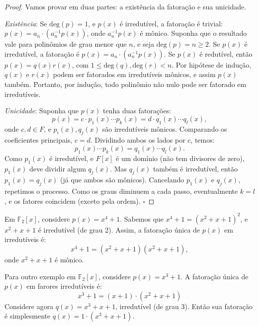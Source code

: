 \begin{proof}
Vamos provar em duas partes: a existência da fatoração e sua unicidade.

  \emph{Existência}: Se $\text{deg}(p) = 1$, e $p(x)$ é irredutível, a
  fatoração é trivial: $p(x) = a_n \cdot (a_n^{-1} p(x))$, onde $a_n^{-1} p(x)$
  é mônico. Suponha que o resultado vale para polinômios de grau menor que $n$,
  e seja $\text{deg}(p) = n \geq 2$. Se $p(x)$ é irredutível, a fatoração é
  $p(x) = a_n \cdot (a_n^{-1} p(x))$. Se $p(x)$ é redutível, então $p(x) = q(x) r(x)$,
  com $1 \leq \text{deg}(q), \text{deg}(r) < n$. Por hipótese de
  indução, $q(x)$ e $r(x)$ podem ser fatorados em irredutíveis mônicos, e assim
  $p(x)$ também. Portanto, por indução, todo polinômio não nulo pode ser
  fatorado em irredutíveis.

  \emph{Unicidade}: Suponha que $p(x)$ tenha duas fatorações:
  \[
  p(x) = c \cdot p_1(x) \cdots p_k(x) = d \cdot q_1(x) \cdots q_l(x),
  \]
  onde $c, d \in F$, e $p_i(x), q_j(x)$ são irredutíveis mônicos. Comparando os
  coeficientes principais, $c = d$. Dividindo ambos os lados por $c$, temos:
  \[
  p_1(x) \cdots p_k(x) = q_1(x) \cdots q_l(x).
  \]
  Como $p_1(x)$ é irredutível, e $F[x]$ é um domínio (não tem divisores de zero),
  $p_1(x)$ deve dividir algum $q_j(x)$. Mas $q_j(x)$ também é irredutível,
  então $p_1(x) = q_j(x)$ (já que ambos são mônicos). Cancelando $p_1(x)$ e
  $q_j(x)$, repetimos o processo. Como os graus diminuem a cada passo,
  eventualmente $k = l$, e os fatores coincidem (exceto pela ordem). \hfill
  $\square$
\end{proof}

\begin{example}
  Em $\mathbb{F}_2[x]$, considere $p(x) = x^4 + 1$. Sabemos que $x^4 + 1 = (x^2 + x + 1)^2$,
  e $x^2 + x + 1$ é irredutível (de grau 2). Assim, a fatoração
  única de $p(x)$ em irredutíveis é:
  \[
  x^4 + 1 = (x^2 + x + 1) (x^2 + x + 1),
  \]
  onde $x^2 + x + 1$ é mônico. 
\end{example} 

\begin{example}
  Para outro exemplo em $\mathbb{F}_2[x]$, considere $p(x) = x^3 + 1$.
  A fatoração única de $p(x)$ em farores irredutíveis é:
  \[
   x^3 + 1 = (x + 1)\cdot(x^2 + x + 1)
  \]
  Considere agora $q(x) = x^3 + x + 1$, irredutível (de grau 3). Então sua
  fatoração é simplesmente $q(x) = 1 \cdot (x^3 + x + 1)$.
\end{example}









